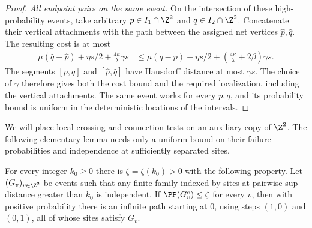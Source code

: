 \begin{proof}
\emph{All endpoint pairs on the same event.}
On the intersection of these high-probability events, take arbitrary
$p\in I_1\cap\Z^2$ and $q\in I_2\cap\Z^2$. Concatenate their vertical
attachments with the path between the assigned net vertices
$\widehat p,\widehat q$. The resulting cost is at most
\[
 \begin{split}
 \mu(\widehat q-\widehat p)+\eta s/2
       +\frac{4\kappa}{\lambda}\gamma s
 &\le \mu(q-p)+\eta s/2
       +\left(\frac{4\kappa}{\lambda}+2\beta\right)\gamma s.
 \end{split}
\]
The segments $[p,q]$ and $[\widehat p,\widehat q]$ have Hausdorff distance
at most $\gamma s$. The choice of $\gamma$ therefore gives both the cost
bound and the required localization, including the vertical attachments.
The same event works for every $p,q$, and its probability bound is uniform
in the deterministic locations of the intervals.
\end{proof}

We will place local crossing and connection tests on an auxiliary copy of
$\Z^2$. The following elementary lemma needs only a uniform bound on their
failure probabilities and independence at sufficiently separated sites.

\begin{lemma}\label{df:cr:oriented-paths}
For every integer $k_0\ge0$ there is $\zeta=\zeta(k_0)>0$ with the
following property. Let $(G_v)_{v\in\Z^2}$ be events such that any finite
family indexed by sites at pairwise sup distance greater than $k_0$ is
independent. If $\PP(G_v^c)\le\zeta$ for every $v$, then with positive
probability there is an infinite path starting at $0$, using steps
$(1,0)$ and $(0,1)$, all of whose sites satisfy $G_v$.
\end{lemma}

